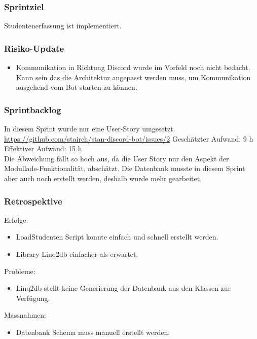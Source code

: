 \documentclass[a4paper, table]{article}
\begin{document}
\subsubsection*{Sprintziel}
Studentenerfassung ist implementiert.

\subsubsection*{Risiko-Update}
\begin{itemize}
    \item Kommunikation in Richtung Discord wurde im Vorfeld noch nicht bedacht.
    Kann sein das die Architektur angepasst werden muss, um Kommunikation ausgehend vom Bot starten zu können.
\end{itemize}

\subsubsection*{Sprintbacklog}
In diesem Sprint wurde nur eine User-Story umgesetzt.\\
\url{https://github.com/stairch/stan-discord-bot/issues/2}
\newline
Geschätzter Aufwand: 9 h
\newline
Effektiver Aufwand: 15 h\\
Die Abweichung fällt so hoch aus, da die User Story nur den Aspekt der Modullade-Funktionalität, abschätzt.
Die Datenbank musste in diesem Sprint aber auch noch erstellt werden, deshalb wurde mehr gearbeitet.

\subsubsection*{Retrospektive}
Erfolge:
\begin{itemize}
    \item LoadStudenten Script konnte einfach und schnell erstellt werden.
    \item Library Linq2db einfacher als erwartet.
\end{itemize}
Probleme:
\begin{itemize}
    \item Linq2db stellt keine Generierung der Datenbank aus den Klassen zur Verfügung.
\end{itemize}
Massnahmen:
\begin{itemize}
    \item Datenbank Schema muss manuell erstellt werden.
\end{itemize}
\newpage
\end{document}
